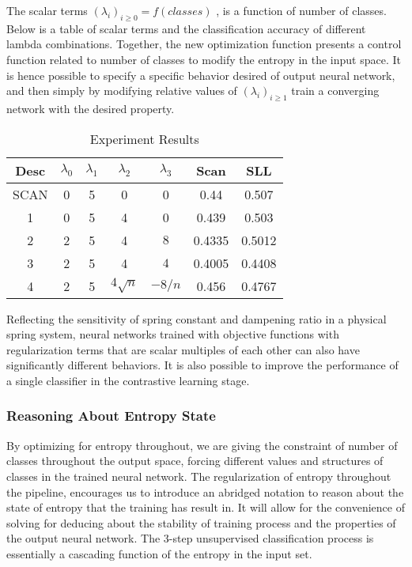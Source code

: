 \documentclass[10pt,twocolumn,letterpaper]{article}
\begin{document}
The scalar terms $(\lambda_i)_{i \geq 0} = f(classes)$ , is a function of number of classes. Below is a table of scalar terms and the classification accuracy of different lambda combinations. Together, the new optimization function presents a control function related to number of classes to modify the entropy in the input space. It is hence possible to specify a specific behavior desired of output neural network, and then simply by modifying relative values of  $(\lambda_i)_{i \geq 1}$ train a converging network with the desired property.
\begin{table}[h]
\caption{Experiment Results}
\label{tab:tabela1}
\begin{tabular}{|c|c|c|c|c|c|c|}
\hline
Desc & $\lambda_{0}$ & $\lambda_{1}$ & $\lambda_{2}$ & $\lambda_{3}$ & Scan & SLL  \\ \hline
SCAN & 0 & 5 & 0 & 0 & 0.44 & 0.507       \\
1 & 0 & 5 & 4 & 0 & 0.439 & 0.503 \\
2 & 2 & 5 & 4 & $8$ & 0.4335 & 0.5012 \\
3 & 2 & 5 & 4 & $4$ & 0.4005 & 0.4408 \\
4 & 2 & 5 & $4\sqrt{n}$ & $-8/n$ & 0.456 & 0.4767 \\
\hline
\end{tabular}
\end{table}

Reflecting the sensitivity of spring constant and dampening ratio in a physical spring system, neural networks trained with objective functions with regularization terms that are scalar multiples of each other can also have significantly different behaviors. It is also possible to improve the performance of a single classifier in the contrastive learning stage.


\subsubsection{Reasoning About Entropy State}
 By optimizing for entropy throughout, we are giving the constraint of number of classes throughout the output space, forcing different values and structures of classes in the trained neural network. The regularization of entropy throughout the pipeline, encourages us to introduce an abridged notation to reason about the state of entropy that the training has result in. It will allow for the convenience of solving for deducing about the stability of training process and the properties of the output neural network. The 3-step unsupervised classification process is essentially a cascading function of the entropy in the input set. 
\end{document}
